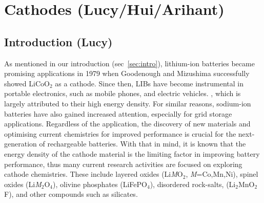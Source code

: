 \documentclass[../main.tex]{subfiles}
\begin{document}
\section{Cathodes (Lucy/Hui/Arihant)}
\label{sec:cathodes}

\subsection{Introduction (Lucy)}
\label{sec:cathode_intro}
As mentioned in our introduction (sec~\ref{sec:intro}), lithium-ion batteries became promising applications in 1979 when Goodenough and Mizushima successfully showed LiCoO$_2$ as a cathode.\cite{mizushima1980lixcoo2} Since then, LIBs have become instrumental in portable electronics, such as mobile phones, and electric vehicles. \cite{rozier2015li, whittingham2008materials, dunn2011electrical, liu2013materials,palacin2009recent}, which is largely attributed to their high energy density. \cite{masquelier2013polyanionic,armand2008building,bruce2012li,park2010review,scrosati2011lithium,goodenough_li-ion_2013,etacheri2011challenges,takada2013progress,fergus2010recent,ellis2010positive,he2012layered,zaghib2013review} For similar reasons, sodium-ion batteries have also gained increased attention, especially for grid storage applications. \cite{ellis2012curr,kim2012electrode,palomares2012ion,fergus2012ion,yabuuchi2012p2} Regardless of the application, the discovery of new materials and optimising current chemistries for improved performance is crucial for the next-generation of rechargeable batteries. With that in mind, it is known that the energy density of the cathode material is the limiting factor in improving battery performance, thus many current research activities are focused on exploring cathode chemistries. These include layered oxides (Li\textit{M}O$_2$, \textit{M}=Co,Mn,Ni), spinel oxides (Li\textit{M}$_2$O$_4$), olivine phosphates (LiFePO$_4$), disordered rock-salts, (Li$_2$MnO$_2$F), and other compounds such as silicates. \cite{daniel2014cathode, islam2014lithium}
\end{document}
